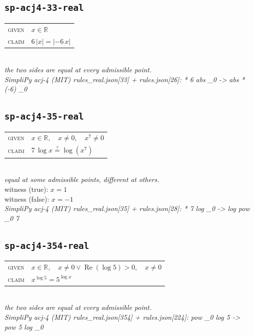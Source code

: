 \documentclass[11pt]{article}
\begin{document}
\subsection*{\texttt{sp-acj4-33-real}}
\begin{tabular}{@{}l@{\quad}l@{}}
\textsc{given} & $x \in \mathbb{R}$ \\[4pt]
\textsc{claim} & $\displaystyle 6 \, \left|x\right| = \left|-6 \, x\right|$ \\
\end{tabular}\\[2pt]
{\small\emph{the two sides are equal at every admissible point.}}\\
\emph{SimpliPy acj-4 (MIT) rules\_real.json[33] + rules.json[26]: * 6 abs \_0  ->  abs * (-6) \_0}\\

\subsection*{\texttt{sp-acj4-35-real}}
\begin{tabular}{@{}l@{\quad}l@{}}
\textsc{given} & $x \in \mathbb{R},\quad x \neq 0,\quad x^{7} \neq 0$ \\[4pt]
\textsc{claim} & $\displaystyle 7 \, \log x \overset{?}{=} \log\left(x^{7}\right)$ \\
\end{tabular}\\[2pt]
{\small\emph{equal at some admissible points, different at others.}}\\
{\footnotesize\color{gray}witness (true): $x = 1$}\\
{\footnotesize\color{gray}witness (false): $x = -1$}\\
\emph{SimpliPy acj-4 (MIT) rules\_real.json[35] + rules.json[28]: * 7 log \_0  ->  log pow \_0 7}\\

\subsection*{\texttt{sp-acj4-354-real}}
\begin{tabular}{@{}l@{\quad}l@{}}
\textsc{given} & $x \in \mathbb{R},\quad x \neq 0 \lor \operatorname{Re}\left(\log 5\right) > 0,\quad x \neq 0$ \\[4pt]
\textsc{claim} & $\displaystyle x^{\log 5} = 5^{\log x}$ \\
\end{tabular}\\[2pt]
{\small\emph{the two sides are equal at every admissible point.}}\\
\emph{SimpliPy acj-4 (MIT) rules\_real.json[354] + rules.json[224]: pow \_0 log 5  ->  pow 5 log \_0}\\
\end{document}
